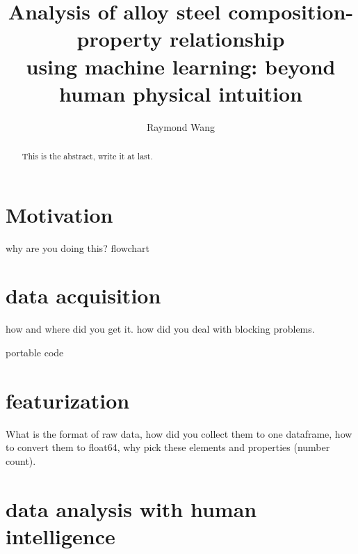 \documentclass[10pt,aps,prb,amsmath,amssymb,twocolumn,letterpaper,nobalancelastpage,final,citeautoscript,floatfix,raggedbottom,superscriptaddress]{revtex4-1}
\begin{document}
\title{Analysis of alloy steel composition-property relationship \\ using machine learning:  beyond human physical intuition}

\author{Raymond Wang}

  

\begin{abstract}
This is the abstract, write it at last.
\end{abstract}

\maketitle


\section{Motivation}
why are you doing this?
flowchart

\section{data acquisition}
how and where did you get it. how did you deal with blocking problems.

portable code
\section{featurization}

What is the format of raw data, how did you collect them to one dataframe, how to convert them to float64, why pick these elements and properties (number count).

\section{data analysis with human intelligence}

\end{document}
